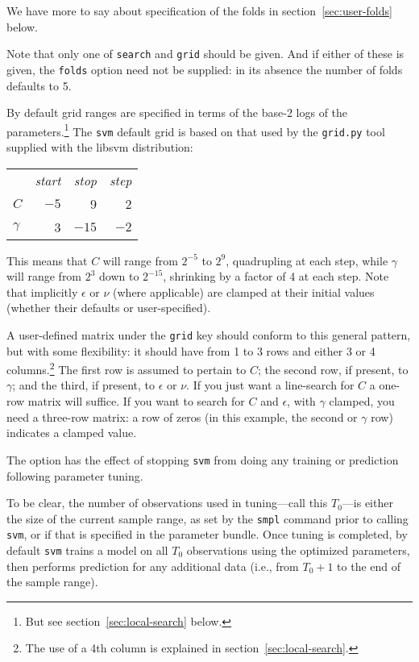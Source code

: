 \documentclass{article}
\begin{document}
We have more to say about specification of the folds in
section~\ref{sec:user-folds} below.

Note that only one of \texttt{search} and \texttt{grid} should be
given. And if either of these is given, the \texttt{folds} option
need not be supplied: in its absence the number of folds defaults to
5.

By default grid ranges are specified in terms of the base-2 logs of
the parameters.\footnote{But see section~\ref{sec:local-search}
  below.}  The \texttt{svm} default grid is based on that used by the
\texttt{grid.py} tool supplied with the \textsf{libsvm} distribution:
\begin{center}
\begin{tabular}{lrrr}
 & \textit{start} & \textit{stop} & \textit{step} \\[2pt]
$C$ & $-5$ & 9 & 2 \\
$\gamma$ & 3 & $-15$ & $-2$
\end{tabular}
\end{center}

This means that $C$ will range from $2^{-5}$ to $2^9$, quadrupling at
each step, while $\gamma$ will range from $2^3$ down to $2^{-15}$,
shrinking by a factor of 4 at each step. Note that implicitly
$\epsilon$ or $\nu$ (where applicable) are clamped at their initial
values (whether their defaults or user-specified).

A user-defined matrix under the \texttt{grid} key should conform to
this general pattern, but with some flexibility: it should have from 1
to 3 rows and either 3 or 4 columns.\footnote{The use of a 4th column
  is explained in section~\ref{sec:local-search}.} The first row is
assumed to pertain to $C$; the second row, if present, to $\gamma$;
and the third, if present, to $\epsilon$ or $\nu$. If you just want a
line-search for $C$ a one-row matrix will suffice.  If you want to
search for $C$ and $\epsilon$, with $\gamma$ clamped, you need a
three-row matrix: a row of zeros (in this example, the second or
$\gamma$ row) indicates a clamped value.

The  option has the effect of stopping
\texttt{svm} from doing any training or prediction following parameter
tuning.

To be clear, the number of observations used in tuning---call this
$T_0$---is either the size of the current sample range, as set by the
\texttt{smpl} command prior to calling \texttt{svm}, or
 if that is specified in the parameter bundle. Once
tuning is completed, by default \texttt{svm} trains a model on all
$T_0$ observations using the optimized parameters, then performs
prediction for any additional data (i.e., from $T_0 + 1$ to the end of
the sample range).
\end{document}
